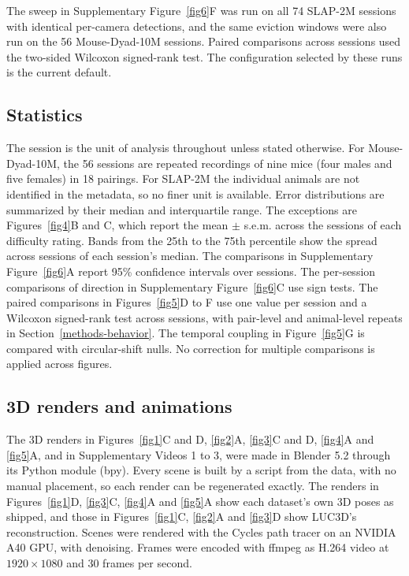 \documentclass[pdflatex, sn-nature]{sn-jnl}
\theoremstyle{thmstyleone}%
\theoremstyle{thmstyletwo}%
\theoremstyle{thmstylethree}%
\begin{document}
The sweep in Supplementary Figure~\ref{fig6}F was run on all 74 SLAP-2M sessions with identical per-camera detections, and the same eviction windows were also run on the 56 Mouse-Dyad-10M sessions. Paired comparisons across sessions used the two-sided Wilcoxon signed-rank test. The configuration selected by these runs is the current default.

\subsection{Statistics}\label{methods-stats}

The session is the unit of analysis throughout unless stated otherwise. For Mouse-Dyad-10M, the 56 sessions are repeated recordings of nine mice (four males and five females) in 18 pairings. For SLAP-2M the individual animals are not identified in the metadata, so no finer unit is available. Error distributions are summarized by their median and interquartile range. The exceptions are Figures~\ref{fig4}B and C, which report the mean $\pm$ s.e.m. across the sessions of each difficulty rating. Bands from the 25th to the 75th percentile show the spread across sessions of each session's median. The comparisons in Supplementary Figure~\ref{fig6}A report 95\% confidence intervals over sessions. The per-session comparisons of direction in Supplementary Figure~\ref{fig6}C use sign tests. The paired comparisons in Figures~\ref{fig5}D to F use one value per session and a Wilcoxon signed-rank test across sessions, with pair-level and animal-level repeats in Section~\ref{methods-behavior}. The temporal coupling in Figure~\ref{fig5}G is compared with circular-shift nulls. No correction for multiple comparisons is applied across figures.

\subsection{3D renders and animations}\label{methods-blender}
The 3D renders in Figures~\ref{fig1}C and D, \ref{fig2}A, \ref{fig3}C and D, \ref{fig4}A and \ref{fig5}A, and in Supplementary Videos 1 to 3, were made in Blender 5.2 through its Python module (bpy). Every scene is built by a script from the data, with no manual placement, so each render can be regenerated exactly. The renders in Figures~\ref{fig1}D, \ref{fig3}C, \ref{fig4}A and \ref{fig5}A show each dataset's own 3D poses as shipped, and those in Figures~\ref{fig1}C, \ref{fig2}A and \ref{fig3}D show LUC3D's reconstruction. Scenes were rendered with the Cycles path tracer on an NVIDIA A40 GPU, with denoising. Frames were encoded with ffmpeg as H.264 video at $1920 \times 1080$ and 30 frames per second.
\end{document}
